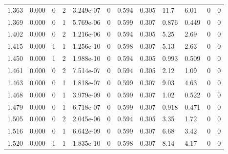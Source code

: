 \documentclass[preview]{standalone}
\begin{document}
{{{\begin{tabular}{L{1.2cm}C{1.2cm} C{0.3cm}C{0.5cm} C{1.4cm}C{1.4cm} C{1.4cm}C{1.4cm} C{1.6cm}C{1.6cm} C{1.6cm}C{1.6cm}}
  1.363  &  0.000  & 0     &  2 &  3.249e-07  & 0  &  0.594&   0.305& 11.7 & 6.01   &  0 & 0  \\ 
  1.369  &  0.000  & 0     &  1 &  5.769e-06  & 0  &  0.599&   0.307& 0.876 & 0.449   &  0 & 0  \\ 
  1.402  &  0.000  & 0     &  2 &  1.216e-06  & 0  &  0.594&   0.305& 5.25 & 2.69   &  0 & 0  \\ 
  1.415  &  0.000  & 1     &  1 &  1.256e-10  & 0  &  0.598&   0.307& 5.13 & 2.63   &  0 & 0  \\ 
  1.450  &  0.000  & 1     &  2 &  1.988e-10  & 0  &  0.594&   0.305& 0.993 & 0.509   &  0 & 0  \\ 
  1.461  &  0.000  & 0     &  2 &  7.514e-07  & 0  &  0.594&   0.305& 2.12 & 1.09   &  0 & 0  \\ 
  1.463  &  0.000  & 0     &  1 &  1.818e-07  & 0  &  0.599&   0.307& 9.03 & 4.63   &  0 & 0  \\ 
  1.468  &  0.000  & 0     &  1 &  3.979e-09  & 0  &  0.599&   0.307& 1.02 & 0.522   &  0 & 0  \\ 
  1.479  &  0.000  & 0     &  1 &  6.718e-07  & 0  &  0.599&   0.307& 0.918 & 0.471   &  0 & 0  \\ 
  1.505  &  0.000  & 0     &  2 &  2.045e-06  & 0  &  0.594&   0.305& 3.35 & 1.72   &  0 & 0  \\ 
  1.516  &  0.000  & 0     &  1 &  6.642e-09  & 0  &  0.599&   0.307& 6.68 & 3.42   &  0 & 0  \\ 
  1.520  &  0.000  & 1     &  1 &  1.835e-10  & 0  &  0.598&   0.307& 8.14 & 4.17   &  0 & 0  \\ 
\hline 
\end{tabular} 

}}}
\end{document}
